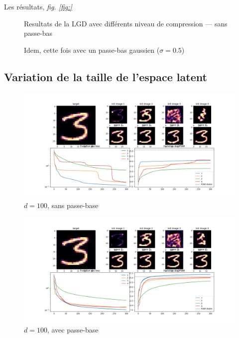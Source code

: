 \documentclass[hidelinks, french]{article} %
\theoremstyle{enonce}
\theoremstyle{special}
\theoremstyle{rq}
\theoremstyle{exo}
\theoremstyle{demo}
\begin{document}
Les résultats, \textit{fig. \ref{fig:}}

\begin{figure}[H]\centering
	
	\caption{Resultats de la LGD avec différents niveau de compression --- sans passe-bas}
	\label{fig:LGD comp_inits g}
\end{figure}

\begin{figure}[H]\centering
	
	\caption{Idem, cette fois avec un passe-bas gaussien ($\sigma=0.5$)}
	\label{fig:LGD comp_inits g}
\end{figure}



\subsection{Variation de la taille de l'espace latent}


\begin{figure}[H]\centering
    \includegraphics[width=1\textwidth]{../resultats/LGD/differents latents/lat-s_100_fig.png}
    \caption{$d=100$, sans passe-base}
    \label{fig:LGD comp_size g}
\end{figure}

\begin{figure}[H]\centering
	\includegraphics[width=1\textwidth]{../resultats/LGD/differents latents/lat-g_100_fig.png}
	\caption{$d=100$, avec passe-base}
	\label{fig:LGD comp_size g}
\end{figure}
\end{document}
